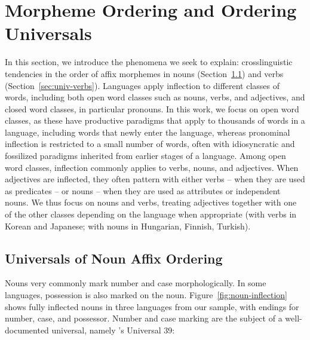 \documentclass[11pt,letterpaper]{article}
\newcommand{\citep}{\parencite}
\newcommand{\citet}{\Textcite}
\newcommand{\jd}[1]{\textcolor{Pink}{[jd: #1]}}
\begin{document}





\section{Morpheme Ordering and Ordering Universals}


In this section, we introduce the phenomena we seek to explain: crosslinguistic tendencies in the order of affix morphemes in nouns (Section~\ref{sec:univ-nouns}) and verbs (Section~\ref{sec:univ-verbs}).
Languages apply inflection to different classes of words, including both open word classes such as nouns, verbs, and adjectives, and closed word classes, in particular pronouns.
In this work, we focus on open word classes, as these have productive paradigms that apply to thousands of words in a language, including words that newly enter the language, whereas pronominal inflection is restricted to a small number of words, often with idiosyncratic and fossilized paradigms inherited from earlier stages of a language.
Among open word classes, inflection commonly applies to verbs, nouns, and adjectives.
When adjectives are inflected, they often pattern with either verbs -- when they are used as predicates -- or nouns -- when they are used as attributes or independent nouns.
We thus focus on nouns and verbs, treating adjectives together with one of the other classes depending on the language when appropriate (with verbs in Korean and Japanese; with nouns in Hungarian, Finnish, Turkish).

\subsection{Universals of Noun Affix Ordering}\label{sec:univ-nouns}
Nouns very commonly mark number and case morphologically.
In some languages, possession is also marked on the noun.
Figure~\ref{fig:noun-inflection} shows fully inflected nouns in three languages from our sample, with endings for number, case, and possessor.
Number and case marking are the subject of a well-documented universal, namely \citet{greenberg1963universals}'s Universal 39:
\end{document}

